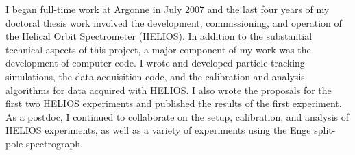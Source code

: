 {I began full-time work at Argonne in July 2007 and the last four years of my doctoral thesis work involved the
 development, commissioning, and operation of the Helical Orbit Spectrometer (HELIOS).
In addition to the substantial technical aspects of this project,
 a major component of my work was the development of computer code. %
I wrote and developed particle tracking simulations, %
 the data acquisition code, and %
 the calibration and analysis algorithms for data acquired with HELIOS. 
 I also wrote the proposals for the first two HELIOS experiments and published the results of the first experiment.
As a postdoc, 
 I continued to collaborate on %
the setup, calibration, and analysis of HELIOS experiments, as well as %
 a variety of experiments using the Enge split-pole spectrograph.%

}
